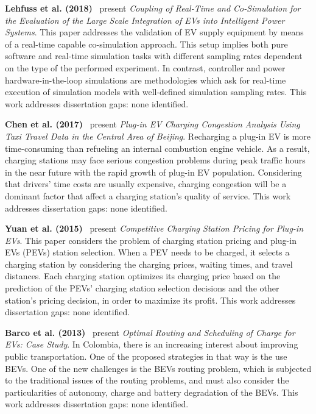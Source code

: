 \documentclass[letterpaper, 12pt, oneside, doublespacing]{Thesis}
\begin{document}
\noindent \textbf{Lehfuss et al. (2018)}~\cite{coupling_of_2018} present \textit{Coupling of Real-Time and Co-Simulation for the Evaluation of the Large Scale Integration of EVs into Intelligent Power Systems}. This paper addresses the validation of EV supply equipment by means of a real-time capable co-simulation approach. This setup implies both pure software and real-time simulation tasks with different sampling rates dependent on the type of the performed experiment. In contrast, controller and power hardware-in-the-loop simulations are methodologies which ask for real-time execution of simulation models with well-defined simulation sampling rates. This work addresses dissertation gaps: none identified.



\noindent \textbf{Chen et al. (2017)}~\cite{plug-in_electric_2017} present \textit{Plug-in EV Charging Congestion Analysis Using Taxi Travel Data in the Central Area of Beijing}. Recharging a plug-in EV is more time-consuming than refueling an internal combustion engine vehicle. As a result, charging stations may face serious congestion problems during peak traffic hours in the near future with the rapid growth of plug-in EV population. Considering that drivers' time costs are usually expensive, charging congestion will be a dominant factor that affect a charging station's quality of service. This work addresses dissertation gaps: none identified.



\noindent \textbf{Yuan et al. (2015)}~\cite{competitive_charging_2015} present \textit{Competitive Charging Station Pricing for Plug-in EVs}. This paper considers the problem of charging station pricing and plug-in EVs (PEVs) station selection. When a PEV needs to be charged, it selects a charging station by considering the charging prices, waiting times, and travel distances. Each charging station optimizes its charging price based on the prediction of the PEVs' charging station selection decisions and the other station's pricing decision, in order to maximize its profit. This work addresses dissertation gaps: none identified.



\noindent \textbf{Barco et al. (2013)}~\cite{optimal_routing_2013} present \textit{Optimal Routing and Scheduling of Charge for EVs: Case Study}. In Colombia, there is an increasing interest about improving public transportation. One of the proposed strategies in that way is the use BEVs. One of the new challenges is the BEVs routing problem, which is subjected to the traditional issues of the routing problems, and must also consider the particularities of autonomy, charge and battery degradation of the BEVs. This work addresses dissertation gaps: none identified.
\end{document}
